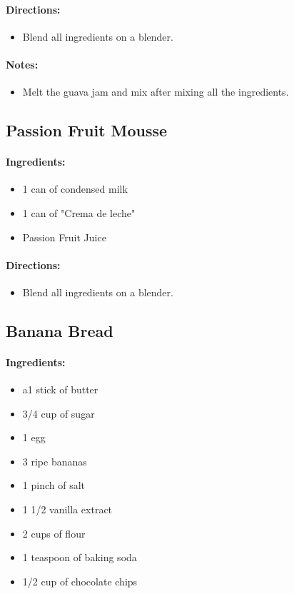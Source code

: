 \documentclass{article}
\begin{document}
\paragraph{Directions:}
\begin{itemize}
    \item Blend all ingredients on a blender.
\end{itemize}

\paragraph{Notes:}
\begin{itemize}
    \item Melt the guava jam and mix after mixing all the ingredients.
\end{itemize}

\subsection{Passion Fruit Mousse}

\paragraph{Ingredients:}
\begin{itemize}
    \item 1 can of condensed milk
    \item 1 can of "Crema de leche"
    \item Passion Fruit Juice
\end{itemize}

\paragraph{Directions:}
\begin{itemize}
    \item Blend all ingredients on a blender.
\end{itemize}

\subsection{Banana Bread}

\paragraph{Ingredients:}
\begin{itemize}
    \item a1 stick of butter
    \item 3/4 cup of sugar
    \item 1 egg
    \item 3 ripe bananas
    \item 1 pinch of salt
    \item 1 1/2 vanilla extract
    \item 2 cups of flour
    \item 1 teaspoon of baking soda
    \item 1/2 cup of chocolate chips
\end{itemize}
\end{document}
